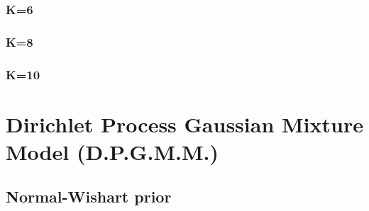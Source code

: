 \documentclass{article}
\begin{document}
\subsubsection{K=6}
\subsubsection{K=8}
\subsubsection{K=10}


\section{Dirichlet Process Gaussian Mixture Model (D.P.G.M.M.)}
\subsection{Normal-Wishart prior}
\end{document}
